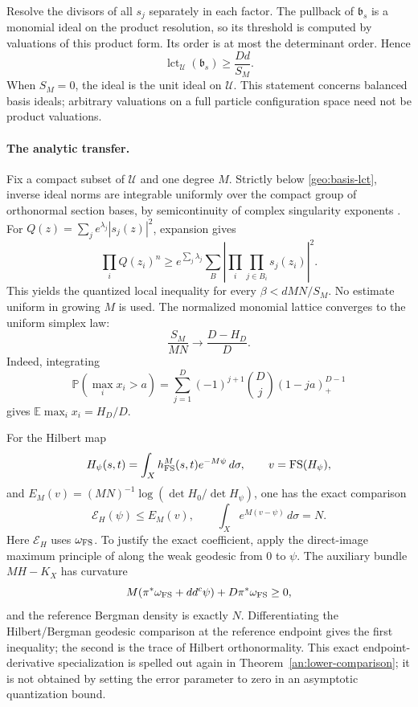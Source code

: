 Resolve the divisors of all \(s_j\) separately in each factor. The
pullback of \(\mathfrak b_s\) is a monomial ideal on the product resolution,
so its threshold is computed by valuations of this product form. Its
order is at most the determinant order. Hence
\begin{equation}
 \operatorname{lct}_{\mathcal U}(\mathfrak b_s)
 \ge\frac{Dd}{S_M}.
 \label{geo:basis-lct}
\end{equation}
When \(S_M=0\), the ideal is the unit ideal on \(\mathcal U\).
This statement concerns balanced basis ideals; arbitrary valuations on a
full particle configuration space need not be product valuations.

\paragraph{The analytic transfer.}
Fix a compact subset of \(\mathcal U\) and one degree \(M\). Strictly
below \eqref{geo:basis-lct}, inverse ideal norms are integrable uniformly
over the compact group of orthonormal section bases, by semicontinuity
of complex singularity exponents \cite{geo_demailly_kollar2001}.
For \(Q(z)=\sum_j e^{\lambda_j}|s_j(z)|^2\), expansion gives
\[
 \prod_iQ(z_i)^n\ge e^{\sum_j\lambda_j}
 \sum_B\left|\prod_i\prod_{j\in B_i}s_j(z_i)\right|^2.
\]
This yields the quantized local inequality for every
\(\beta<dMN/S_M\). No estimate uniform in growing \(M\) is used.
The normalized monomial lattice converges to the uniform simplex law:
\begin{equation}
 \frac{S_M}{MN}\longrightarrow\frac{D-H_D}{D}.
 \label{geo:monomial-limit}
\end{equation}
Indeed, integrating
\[
 \mathbb P(\max_i x_i>a)
 =\sum_{j=1}^D(-1)^{j+1}\binom Dj(1-ja)_+^{D-1}
\]
gives \(\mathbb E\max_i x_i=H_D/D\).

For the Hilbert map
\[
 H_\psi(s,t)=\int_Xh_{\rm FS}^M(s,t)e^{-M\psi}\,d\sigma,\qquad
 v=\operatorname{FS}(H_\psi),
\]
and \(E_M(v)=(MN)^{-1}\log(\det H_0/\det H_\psi)\), one has the exact
comparison
\begin{equation}
 \mathcal E_H(\psi)\le E_M(v),\qquad
 \int_Xe^{M(v-\psi)}\,d\sigma=N.
 \label{geo:exact-quantization}
\end{equation}
Here \(\mathcal E_H\) uses \(\omega_{\rm FS}\). To justify the exact
coefficient, apply the direct-image maximum principle of
\cite[Propositions 4.1--4.2]{geo_zhang2024} along the weak geodesic
from \(0\) to \(\psi\). The auxiliary bundle \(MH-K_X\) has curvature
\[
 M(\pi^*\omega_{\rm FS}+dd^c\psi)+D\pi^*\omega_{\rm FS}\ge0,
\]
and the reference Bergman density is exactly \(N\). Differentiating the
Hilbert/Bergman geodesic comparison at the reference endpoint gives the
first inequality; the second is the trace of Hilbert orthonormality.
This exact endpoint-derivative specialization is spelled out again in
Theorem~\ref{an:lower-comparison}; it is not obtained by setting the error
parameter to zero in an asymptotic quantization bound.

